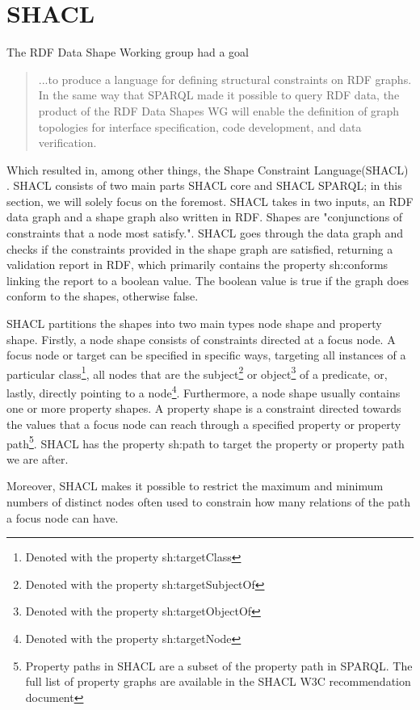 \section{SHACL}

The RDF Data Shape Working group had a goal
\begin{quotation}
    ...to produce a language for defining structural constraints on RDF graphs. In the same way that SPARQL made it possible to query RDF data, the product of the RDF Data Shapes WG will enable the definition of graph topologies for interface specification, code development, and data verification.\autocite{Shape_working_group}
\end{quotation}
Which resulted in, among other things, the Shape Constraint Language(SHACL)\autocite{SHACL} . SHACL consists of two main parts SHACL core and SHACL SPARQL; in this section, we will solely focus on the foremost. SHACL takes in two inputs, an RDF data graph and a shape graph also written in RDF. Shapes are "conjunctions of constraints that a node most satisfy."\autocite[FIND PAGE]{SHACL_BOOK}. SHACL goes through the data graph and checks if the constraints provided in the shape graph are satisfied, returning a validation report in RDF, which primarily contains the property sh:conforms linking the report to a boolean value. The boolean value is true if the graph does conform to the shapes, otherwise false. 

\para 
SHACL partitions the shapes into two main types node shape and property shape. Firstly, a node shape consists of constraints directed at a focus node.  A focus node or target can be specified in specific ways, targeting all instances of a particular class\footnote{Denoted with the property sh:targetClass}, all nodes that are the subject\footnote{Denoted with the property sh:targetSubjectOf} or object\footnote{Denoted with the property sh:targetObjectOf} of a predicate, or, lastly, directly pointing to a node\footnote{Denoted with the property sh:targetNode}. Furthermore, a node shape usually contains one or more property shapes. A property shape is a constraint directed towards the values that a focus node can reach through a specified property or property path\footnote{Property paths in SHACL are a subset of the property path in SPARQL. The full list of property graphs are available in the SHACL W3C recommendation document\autocite{SHACL}}.  SHACL has the property sh:path to target the property or property path we are after.  

\para
Moreover, SHACL makes it possible to restrict the maximum and minimum numbers of distinct nodes often used to constrain how many relations of the path a focus node can have. 

